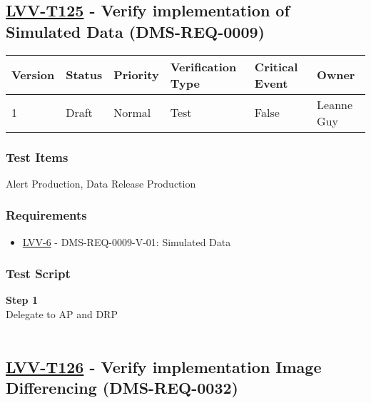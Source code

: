 \hypertarget{lvv-t125---verify-implementation-of-simulated-data-dms-req-0009}{%
\subsection{\texorpdfstring{\href{https://jira.lsstcorp.org/secure/Tests.jspa\#/testCase/LVV-T125}{LVV-T125}
- Verify implementation of Simulated Data
(DMS-REQ-0009)}{LVV-T125 - Verify implementation of Simulated Data (DMS-REQ-0009)}}\label{lvv-t125---verify-implementation-of-simulated-data-dms-req-0009}}

\begin{longtable}[]{@{}llllll@{}}
\toprule
Version & Status & Priority & Verification Type & Critical Event &
Owner\tabularnewline
\midrule
\endhead
1 & Draft & Normal & Test & False & Leanne Guy\tabularnewline
\bottomrule
\end{longtable}

\hypertarget{test-items-101}{%
\subsubsection{Test Items}\label{test-items-101}}

Alert Production, Data Release Production~

\hypertarget{requirements-102}{%
\subsubsection{Requirements}\label{requirements-102}}

\begin{itemize}
\tightlist
\item
  \href{https://jira.lsstcorp.org/browse/LVV-6}{LVV-6} -
  DMS-REQ-0009-V-01: Simulated Data
\end{itemize}

\hypertarget{test-script-102}{%
\subsubsection{Test Script}\label{test-script-102}}

\textbf{Step 1}\\
Delegate to AP and DRP\\
~\\

\hypertarget{lvv-t126---verify-implementation-image-differencing-dms-req-0032}{%
\subsection{\texorpdfstring{\href{https://jira.lsstcorp.org/secure/Tests.jspa\#/testCase/LVV-T126}{LVV-T126}
- Verify implementation Image Differencing
(DMS-REQ-0032)}{LVV-T126 - Verify implementation Image Differencing (DMS-REQ-0032)}}\label{lvv-t126---verify-implementation-image-differencing-dms-req-0032}}

